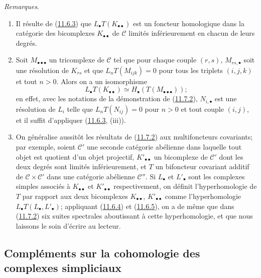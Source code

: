 \begin{env}[11.7.3]
\label{0.11.7.3-fr}
\emph{Remarques}.
\begin{enumerate}
\item[{\rm(i)}] Il résulte de (\hyperref[0.11.6.3-fr]{11.6.3}) que
$L_\bullet T(K_{\bullet\bullet})$ est un foncteur homologique dans la
catégorie des bicomplexes $K_{\bullet\bullet}$ de $\mathcal C$ limités
inférieurement en chacun de leurs degrés.
\item[{\rm(ii)}] Soit $M_{\bullet\bullet\bullet}$ un tricomplexe de
$\mathcal C$ tel que pour chaque couple $(r,s)$,
$M_{rs,\bullet}$ soit une résolution de $K_{rs}$ et que
$L_nT(M_{ijk})=0$ pour tous les triplets $(i,j,k)$ et tout $n>0$. Alors on a
un isomorphisme
\[
L_\bullet T(K_{\bullet\bullet})
\simeq H_\bullet(T(M_{\bullet\bullet\bullet}));
\]
en effet, avec les notations de la démonstration de
(\hyperref[0.11.7.2-fr]{11.7.2}), $N_{i,\bullet}$ est une résolution de
$L_i$ telle que $L_nT(N_{ij})=0$ pour $n>0$ et tout couple $(i,j)$, et il
suffit d'appliquer (\hyperref[0.11.6.3-fr]{11.6.3}, (iii)).
\item[{\rm(iii)}] On généralise aussitôt les résultats de
(\hyperref[0.11.7.2-fr]{11.7.2}) aux multifoncteurs covariants; par exemple,
soient $\mathcal C'$ une seconde catégorie abélienne dans laquelle tout objet
est quotient d'un objet projectif, $K'_{\bullet\bullet}$ un bicomplexe de
$\mathcal C'$ dont les deux degrés sont limités inférieurement, et $T$ un
bifoncteur covariant additif de $\mathcal C\times\mathcal C'$ dans une
catégorie abélienne $\mathcal C''$. Si $L_\bullet$ et $L'_\bullet$ sont les
complexes simples associés à $K_{\bullet\bullet}$ et
$K'_{\bullet\bullet}$ respectivement, on définit l'hyperhomologie de $T$ par
rapport aux deux bicomplexes $K_{\bullet\bullet}$,
$K'_{\bullet\bullet}$ comme l'hyperhomologie
$L_\bullet T(L_\bullet,L'_\bullet)$; appliquant
(\hyperref[0.11.6.4-fr]{11.6.4}) et
(\hyperref[0.11.6.5-fr]{11.6.5}), on a de même que dans
(\hyperref[0.11.7.2-fr]{11.7.2}) six suites spectrales aboutissant à cette
hyperhomologie, et que nous laissons le soin d'écrire au lecteur.
\end{enumerate}
\end{env}

\subsection{Compléments sur la cohomologie des complexes simpliciaux}
\label{subsection:0.11.8-fr}

